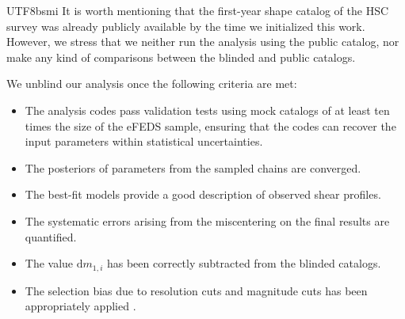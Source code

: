 \documentclass[longauth]{aa}
\newcommand{\dif}{\ensuremath{\mathrm{d}}}
\begin{document}
\begin{CJK*}{UTF8}{bsmi}
It is worth mentioning that the first-year shape catalog of the HSC survey was already publicly available by the time we initialized this work.
However, we stress that we neither run the analysis using the public catalog, nor make any kind of comparisons between the blinded and public catalogs.

We unblind our analysis once the following criteria are met:
%
\begin{itemize}
\item The analysis codes pass validation tests using mock catalogs of at least ten times the size of the eFEDS sample, ensuring that the codes can recover the input parameters within statistical uncertainties.
\item The posteriors of parameters from the sampled chains are converged.
\item The best-fit models provide a good description of observed shear profiles.
\item The systematic errors arising from the miscentering on the final results are quantified.
\item The value $\dif m_{1,i}$ has been correctly subtracted from the blinded catalogs.
\item The selection bias due to resolution cuts and magnitude cuts has  been appropriately applied \citep[see][]{hikage19}.
\end{itemize}
%



\end{CJK*}
\end{document}
